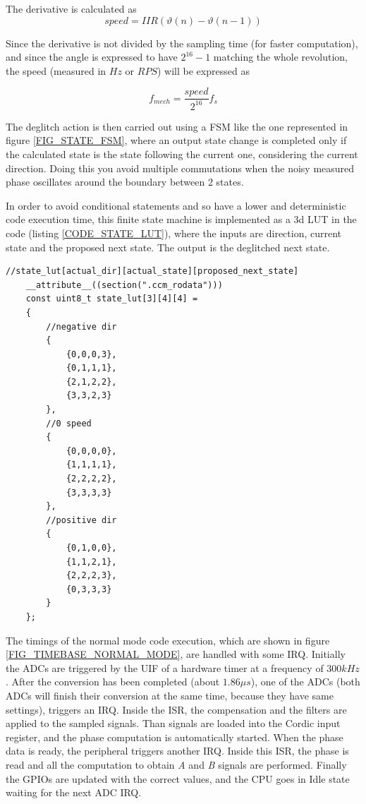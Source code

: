 \documentclass[main]{subfiles}
\begin{document}
The derivative is calculated as
\begin{equation}
    speed = IIR(\vartheta(n) - \vartheta(n-1))
\end{equation}

Since the derivative is not divided by the sampling time (for faster computation), 
and since the angle is expressed to have $2^{16}-1$ matching the whole revolution,
the speed (measured in $Hz$ or $RPS$) will be expressed as 

\begin{equation}
    f_{mech} = \frac{speed}{2^{16}}f_s
\end{equation}

The deglitch action is then carried out using a \ac{FSM} like the one represented in 
figure \ref{FIG_STATE_FSM}, where an output state change is completed only if the 
calculated state is the state following the current one, considering the current 
direction.
Doing this you avoid multiple commutations when the noisy measured phase 
oscillates around the boundary between 2 states.

In order to avoid conditional statements and so have a lower and deterministic 
code execution time, this finite state machine is implemented as a 3d \ac{LUT} 
in the code (listing \ref{CODE_STATE_LUT}), where the inputs are direction, 
current state and the proposed next state. 
The output is the deglitched next state.

\begin{minipage}[h]{\linewidth}
\begin{lstlisting}[caption=next state FSM,label=CODE_STATE_LUT]
    //state_lut[actual_dir][actual_state][proposed_next_state]
    __attribute__((section(".ccm_rodata")))
    const uint8_t state_lut[3][4][4] = 
    {
        //negative dir
        {  
            {0,0,0,3},
            {0,1,1,1},
            {2,1,2,2},
            {3,3,2,3}
        },
        //0 speed
        {
            {0,0,0,0},
            {1,1,1,1},
            {2,2,2,2},
            {3,3,3,3}
        },
        //positive dir
        {
            {0,1,0,0},
            {1,1,2,1},
            {2,2,2,3},
            {0,3,3,3}
        }
    }; 
\end{lstlisting}
\end{minipage}

The timings of the normal mode code execution, which are shown in figure 
\ref{FIG_TIMEBASE_NORMAL_MODE}, are handled with some \ac{IRQ}.
Initially the ADCs are triggered by the \ac{UIF} of a hardware
timer at a frequency of $300 kHz$.
After the conversion has been completed (about $1.86\mu s$), one of the ADCs 
(both ADCs will finish their conversion at the same time, because they have same 
settings), triggers an \ac{IRQ}. Inside the \ac{ISR}, the compensation and the 
filters are applied to the sampled signals. 
Than signals are loaded into the Cordic input register, and the  phase computation 
is automatically started.
When the phase data is ready, the peripheral triggers another \ac{IRQ}.
Inside this \ac{ISR}, the phase is read and all the computation to obtain 
{\it A} and {\it B} signals are performed. Finally the GPIOs are updated with the 
correct values, and the CPU goes in Idle state waiting for the next ADC \ac{IRQ}.
\end{document}
